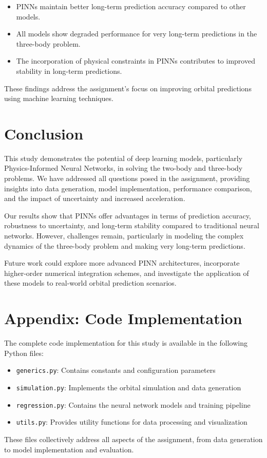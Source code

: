 \documentclass[12pt,a4paper]{article}
\begin{document}
\begin{itemize}
    \item PINNs maintain better long-term prediction accuracy compared to other models.
    \item All models show degraded performance for very long-term predictions in the three-body problem.
    \item The incorporation of physical constraints in PINNs contributes to improved stability in long-term predictions.
\end{itemize}

These findings address the assignment's focus on improving orbital predictions using machine learning techniques.

\section{Conclusion}
\label{sec:conclusion}
This study demonstrates the potential of deep learning models, particularly Physics-Informed Neural Networks, in solving the two-body and three-body problems. We have addressed all questions posed in the assignment, providing insights into data generation, model implementation, performance comparison, and the impact of uncertainty and increased acceleration.

Our results show that PINNs offer advantages in terms of prediction accuracy, robustness to uncertainty, and long-term stability compared to traditional neural networks. However, challenges remain, particularly in modeling the complex dynamics of the three-body problem and making very long-term predictions.

Future work could explore more advanced PINN architectures, incorporate higher-order numerical integration schemes, and investigate the application of these models to real-world orbital prediction scenarios.

\section{Appendix: Code Implementation}
\label{sec:appendix}
The complete code implementation for this study is available in the following Python files:

\begin{itemize}
    \item \texttt{generics.py}: Contains constants and configuration parameters
    \item \texttt{simulation.py}: Implements the orbital simulation and data generation
    \item \texttt{regression.py}: Contains the neural network models and training pipeline
    \item \texttt{utils.py}: Provides utility functions for data processing and visualization
\end{itemize}

These files collectively address all aspects of the assignment, from data generation to model implementation and evaluation.
\end{document}
